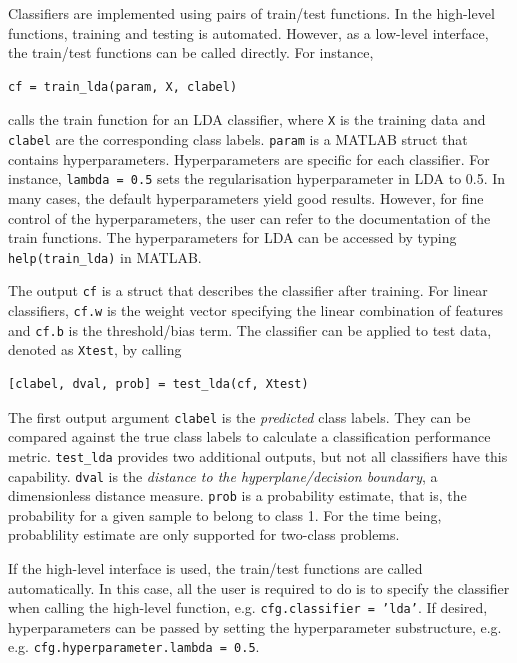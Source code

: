 \documentclass[utf8]{frontiersSCNS} %
\newcommand{\ttt}[1]{\texttt{#1}}
\begin{document}
Classifiers are implemented using pairs of train/test functions. In the high-level functions, training and testing is automated. However, as a low-level interface, the train/test functions can be called directly. For instance, 

\begin{verbatim}
cf = train_lda(param, X, clabel)
\end{verbatim}

calls the train function for an LDA classifier, where \ttt{X} is the training data and \ttt{clabel} are the corresponding class labels. \ttt{param} is a MATLAB struct that contains hyperparameters. Hyperparameters are specific for each classifier. For instance, \ttt{lambda = 0.5} sets the regularisation hyperparameter in LDA to 0.5. In many cases, the default hyperparameters yield good results. However, for fine control of the hyperparameters, the user can refer to the documentation of the train functions. The hyperparameters for LDA can be accessed by typing \ttt{help(train\_lda)} in MATLAB. 

The output \ttt{cf} is a struct that describes the classifier after training. For linear classifiers, \ttt{cf.w} is the weight vector specifying the linear combination of features and \ttt{cf.b} is the threshold/bias term. The classifier can be applied to test data, denoted as \ttt{Xtest}, by calling

\begin{verbatim}
[clabel, dval, prob] = test_lda(cf, Xtest)
\end{verbatim}

The first output argument \ttt{clabel} is the \textit{predicted} class labels. They can be compared against the true class labels to calculate a classification performance metric. \ttt{test\_lda} provides two additional outputs, but not all classifiers have this capability. \ttt{dval} is the \textit{distance to the hyperplane/decision boundary}, a dimensionless distance measure. \ttt{prob} is a probability estimate, that is, the probability for a given sample to belong to class 1. For the time being, probablility estimate are only supported for two-class problems.

If the high-level interface is used, the train/test functions are called  automatically. In this case, all the user is required to do is to specify the classifier when calling the high-level function, e.g. \ttt{cfg.classifier = 'lda'}. If desired, hyperparameters can be passed by setting the hyperparameter substructure, e.g.  e.g. \ttt{cfg.hyperparameter.lambda = 0.5}.
\end{document}
